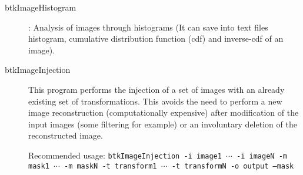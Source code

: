 \begin{description}
\item[btkImageHistogram]: Analysis of images through histograms (It can save into text files histogram, cumulative distribution function (cdf) and inverse-cdf of an image).
\item[btkImageInjection] This program performs the injection of a set
of images with an already existing set of transformations. This avoids the need
to perform a new image reconstruction (computationally expensive) after
modification of the input images (some filtering for example) or an involuntary
deletion of the reconstructed image.

Recommended usage: \texttt{btkImageInjection -i image1 $\cdots$ -i
imageN -m mask1 $\cdots$ -m maskN -t transform1 $\cdots$ -t
transformN -o output --mask}


\end{description}
